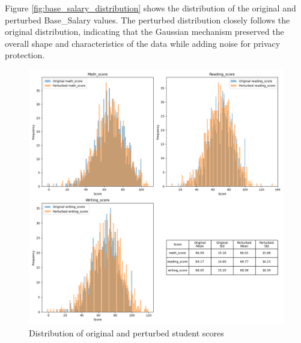 Figure \ref{fig:base_salary_distribution} shows the distribution of the original and perturbed Base\_Salary values. The perturbed distribution closely follows the original distribution, indicating that the Gaussian mechanism preserved the overall shape and characteristics of the data while adding noise for privacy protection.

\begin{figure}[H]
\centering
\includegraphics[width=\textwidth]{report/media/scores.png}
\caption{Distribution of original and perturbed student scores}
\label{fig:student_scores_distribution}
\end{figure}

